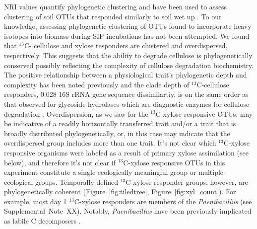 NRI values quantify phylogenetic clustering \citep{Webb2000} and have 
been used to assess clustering of soil OTUs that responded similarly to soil
wet up \citep{Evans2014a,Placella2012}. To our knowledge, assessing
phylogenetic clustering of OTUs found to incorporate heavy isotopes into
biomass during SIP incubations has not been attempted. We found that $^{13}$C-
cellulose and xylose responders are clustered and overdispersed, respectively.
This suggests that the ability to degrade cellulose is phylogenetically
conserved possibly reflecting the complexity of cellulose degradation
biochemistry. The positive relationship between a physiological trait's
phylogenetic depth and complexity has been noted previously
\citep{Martiny2013a} and the clade depth of $^{13}$C-cellulose responders,
0.028 16S rRNA gene sequence dissimilartiy, is on the same order as that
observed for glycoside hydrolases which are diagnostic enzymes for cellulose
degradation \citep{Berlemont2013}. Overdispersion, as we saw for the
$^{13}$C-xylose responsive OTUs, may be indicative of a readily horizontally
transferred trait and/or a trait that is broadly distributed phylogenetically,
or, in this case may indicate that the overdispersed group includes more than
one trait. It's not clear which $^{13}$C-xylose responsive organisms were
labeled as a result of primary xylose assimilation (see below), and therefore
it's not clear if $^{13}$C-xylose responsive OTUs in this experiment constitute
a single ecologically meaningful group or multiple ecological groups.
Temporally defined $^{13}$C-xylose responder groups, however, are
phylogenetically coherent (Figure~\ref{fig:tiledtree},
Figure~\ref{fig:xyl_count}). For example, most day
1 $^{13}$C-xylose responders are members of the \textit{Paenibacillus} (see
Supplemental~Note~XX). Notably, \textit{Paenibacillus} have been previously
implicated as labile C decomposers \citep{Verastegui_2014}.

